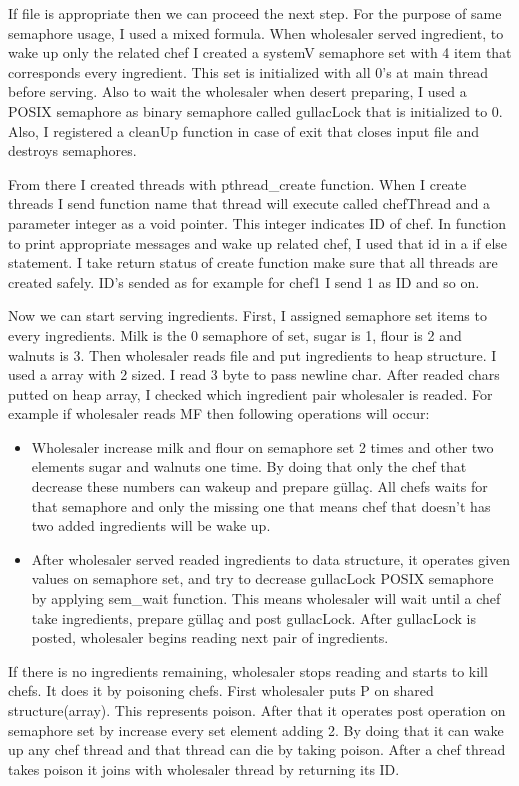 \documentclass[twocolumn]{article}
\begin{document}
If file is appropriate then we can proceed the next step.
For the purpose of same semaphore usage, I used a mixed formula. When wholesaler served ingredient, to wake up only the related chef I created a systemV semaphore set with 4 item that corresponds every ingredient. This set is initialized with all 0's at main thread before serving. Also to wait the wholesaler when desert preparing, I used a POSIX semaphore as binary semaphore called gullacLock that is initialized to 0. Also, I registered a cleanUp function in case of exit that closes input file and destroys semaphores.

From there I created threads with pthread\_create function. When I create threads I send function name that thread will execute called chefThread and a parameter integer as a void pointer. This integer indicates ID of chef. In function to print appropriate messages and wake up related chef, I used that id in a if else statement. I take return status of create function make sure that all threads are created safely. ID's sended as for example for chef1 I send 1 as ID and so on.

Now we can start serving ingredients. First, I assigned semaphore set items to every ingredients. Milk is the 0 semaphore of set, sugar is 1, flour is 2 and walnuts is 3.
Then wholesaler reads file and put ingredients to heap structure. I used a array with 2 sized. I read 3 byte to pass newline char. After readed chars putted on heap array, I checked which ingredient pair wholesaler is readed. For example if wholesaler reads MF then following operations will occur:
\begin{itemize}
    \item Wholesaler increase milk and flour on semaphore set 2 times and other two elements sugar and walnuts one time. By doing that only the chef that decrease these numbers can wakeup and prepare güllaç. All chefs waits for that semaphore and only the missing one that means chef that doesn't has two added ingredients will be wake up. 
    \item After wholesaler served readed ingredients to data structure, it operates given values on semaphore set, and try to decrease gullacLock POSIX semaphore by applying sem\_wait function. This means wholesaler will wait until a chef take ingredients, prepare güllaç and post gullacLock. After gullacLock is posted, wholesaler begins reading next pair of ingredients. 
\end{itemize}

If there is no ingredients remaining, wholesaler stops reading and starts to kill chefs. It does it by poisoning chefs. First wholesaler puts P on shared structure(array). This represents poison. After that it operates post operation on semaphore set by increase every set element adding 2. By doing that it can wake up any chef thread and that thread can die by taking poison. After a chef thread takes poison it joins with wholesaler thread by returning its ID.
\end{document}
